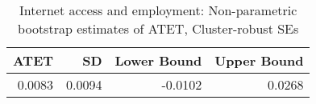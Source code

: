 \begin{table}[!h]
\centering
\caption{\label{tab:tab:np_atet_clustered}Internet access and employment: Non-parametric bootstrap estimates of ATET, Cluster-robust SEs}
\centering
\begin{tabular}[t]{rrrr}
\toprule
ATET & SD & Lower Bound & Upper Bound\\
\midrule
0.0083 & 0.0094 & -0.0102 & 0.0268\\
\bottomrule
\end{tabular}
\end{table}
